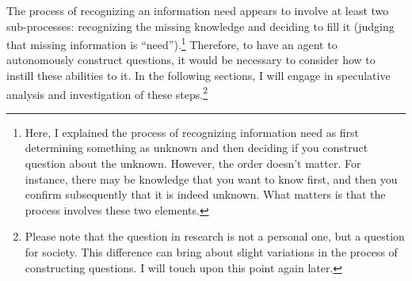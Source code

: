 The process of recognizing an information need appears to involve at least two sub-processes: recognizing the missing knowledge and deciding to fill it (judging that missing information is ``need'').\footnote{
Here, I explained the process of recognizing information need as first determining something as unknown and then deciding if you construct question about the unknown. However, the order doesn't matter. For instance, there may be knowledge that you want to know first, and then you confirm subsequently that it is indeed unknown. What matters is that the process involves these two elements.
} Therefore, to have an agent to autonomously construct questions, it would be necessary to consider how to instill these abilities to it. In the following sections, I will engage in speculative analysis and investigation of these steps.\footnote{
Please note that the question in research is not a personal one, but a question for society. This difference can bring about slight variations in the process of constructing questions. I will touch upon this point again later.

}



